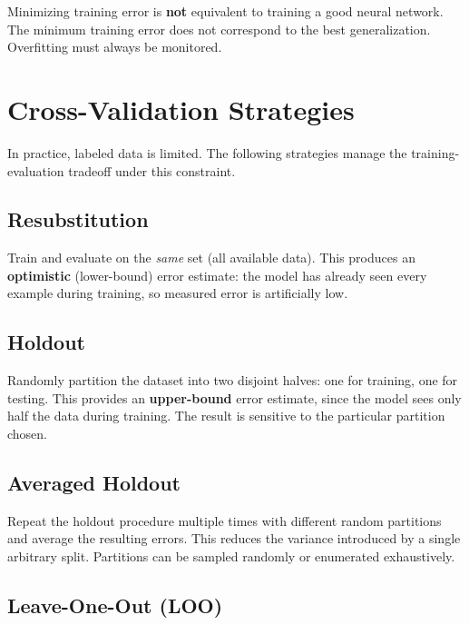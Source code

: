 \documentclass[11pt,a4paper]{article}
\theoremstyle{definition}
\theoremstyle{plain}
\theoremstyle{remark}
\begin{document}
\begin{tcolorbox}[colback=orange!5!white,colframe=orange!75!black,title=\textbf{Key Principle}]
Minimizing training error is \textbf{not} equivalent to training a good neural network. The minimum training error does not correspond to the best generalization. Overfitting must always be monitored.
\end{tcolorbox}


\section{Cross-Validation Strategies}

In practice, labeled data is limited. The following strategies manage the training-evaluation tradeoff under this constraint.

\subsection{Resubstitution}

Train and evaluate on the \emph{same} set (all available data). This produces an \textbf{optimistic} (lower-bound) error estimate: the model has already seen every example during training, so measured error is artificially low.

\subsection{Holdout}

Randomly partition the dataset into two disjoint halves: one for training, one for testing. This provides an \textbf{upper-bound} error estimate, since the model sees only half the data during training. The result is sensitive to the particular partition chosen.

\subsection{Averaged Holdout}

Repeat the holdout procedure multiple times with different random partitions and average the resulting errors. This reduces the variance introduced by a single arbitrary split. Partitions can be sampled randomly or enumerated exhaustively.

\subsection{Leave-One-Out (LOO)}
\end{document}
